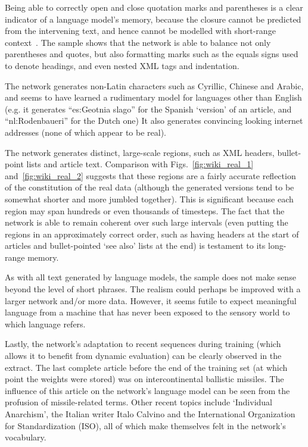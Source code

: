 Being able to correctly open and close quotation marks and parentheses is a clear indicator of a language model's memory, because the closure cannot be predicted from the intervening text, and hence cannot be modelled with short-range context~\cite{sutskever11rnn}. The sample shows that the network is able to balance not only parentheses and quotes, but also formatting marks such as the equals signs used to denote headings, and even nested XML tags and indentation.

The network generates non-Latin characters such as Cyrillic, Chinese and Arabic, and seems to have learned a rudimentary model for languages other than English (e.g. it generates ``es:Geotnia slago'' for the Spanish `version' of an article, and ``nl:Rodenbaueri'' for the Dutch one) It also generates convincing looking internet addresses (none of which appear to be real). 

The network generates distinct, large-scale regions, such as XML headers, bullet-point lists and article text. Comparison with Figs.~\ref{fig:wiki_real_1} and~\ref{fig:wiki_real_2} suggests that these regions are a fairly accurate reflection of the constitution of the real data (although the generated versions tend to be somewhat shorter and more jumbled together). This is significant because each region may span hundreds or even thousands of timesteps. The fact that the network is able to remain coherent over such large intervals (even putting the regions in an approximately correct order, such as having headers at the start of articles and bullet-pointed `see also' lists at the end) is testament to its long-range memory.

As with all text generated by language models, the sample does not make sense beyond the level of short phrases. The realism could perhaps be improved with a larger network and/or more data. However, it seems futile to expect meaningful language from a machine that has never been exposed to the sensory world to which language refers.

Lastly, the network's adaptation to recent sequences during training (which allows it to benefit from dynamic evaluation) can be clearly observed in the extract. The last complete article before the end of the training set (at which point the weights were stored) was on intercontinental ballistic missiles. The influence of this article on the network's language model can be seen from the profusion of missile-related terms. Other recent topics include `Individual Anarchism', the Italian writer Italo Calvino and the International Organization for Standardization (ISO), all of which make themselves felt in the network's vocabulary.

